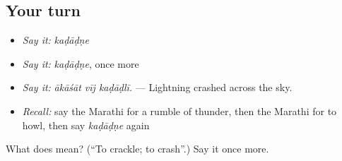 \subsection*{Your turn}
\begin{itemize}
\raggedright
  \item \emph{Say it:} \emph{kaḍāḍṇe}
  \item \emph{Say it:} \emph{kaḍāḍṇe}, once more
  \item \emph{Say it:} \emph{ākāśāt vīj kaḍāḍlī.} — Lightning crashed across the sky.
  \item \emph{Recall:} say the Marathi for a rumble of thunder, then the Marathi for to howl, then say \emph{kaḍāḍṇe} again
\end{itemize}

\begin{tcolorbox}[breakable,colback=teal!4,colframe=teal!35!black,title={Before you move on}]
What does  mean? (\textquotedblleft{}To crackle; to crash\textquotedblright{}.) Say it once more.
\end{tcolorbox}
